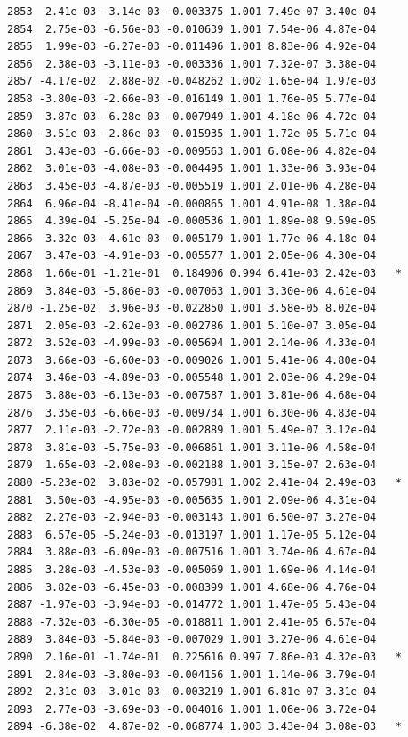 \documentclass[
  letterpaper,
  DIV=11,
  numbers=noendperiod]{scrartcl}
\begin{document}
\begin{verbatim}
2853  2.41e-03 -3.14e-03 -0.003375 1.001 7.49e-07 3.40e-04    
2854  2.75e-03 -6.56e-03 -0.010639 1.001 7.54e-06 4.87e-04    
2855  1.99e-03 -6.27e-03 -0.011496 1.001 8.83e-06 4.92e-04    
2856  2.38e-03 -3.11e-03 -0.003336 1.001 7.32e-07 3.38e-04    
2857 -4.17e-02  2.88e-02 -0.048262 1.002 1.65e-04 1.97e-03    
2858 -3.80e-03 -2.66e-03 -0.016149 1.001 1.76e-05 5.77e-04    
2859  3.87e-03 -6.28e-03 -0.007949 1.001 4.18e-06 4.72e-04    
2860 -3.51e-03 -2.86e-03 -0.015935 1.001 1.72e-05 5.71e-04    
2861  3.43e-03 -6.66e-03 -0.009563 1.001 6.08e-06 4.82e-04    
2862  3.01e-03 -4.08e-03 -0.004495 1.001 1.33e-06 3.93e-04    
2863  3.45e-03 -4.87e-03 -0.005519 1.001 2.01e-06 4.28e-04    
2864  6.96e-04 -8.41e-04 -0.000865 1.001 4.91e-08 1.38e-04    
2865  4.39e-04 -5.25e-04 -0.000536 1.001 1.89e-08 9.59e-05    
2866  3.32e-03 -4.61e-03 -0.005179 1.001 1.77e-06 4.18e-04    
2867  3.47e-03 -4.91e-03 -0.005577 1.001 2.05e-06 4.30e-04    
2868  1.66e-01 -1.21e-01  0.184906 0.994 6.41e-03 2.42e-03   *
2869  3.84e-03 -5.86e-03 -0.007063 1.001 3.30e-06 4.61e-04    
2870 -1.25e-02  3.96e-03 -0.022850 1.001 3.58e-05 8.02e-04    
2871  2.05e-03 -2.62e-03 -0.002786 1.001 5.10e-07 3.05e-04    
2872  3.52e-03 -4.99e-03 -0.005694 1.001 2.14e-06 4.33e-04    
2873  3.66e-03 -6.60e-03 -0.009026 1.001 5.41e-06 4.80e-04    
2874  3.46e-03 -4.89e-03 -0.005548 1.001 2.03e-06 4.29e-04    
2875  3.88e-03 -6.13e-03 -0.007587 1.001 3.81e-06 4.68e-04    
2876  3.35e-03 -6.66e-03 -0.009734 1.001 6.30e-06 4.83e-04    
2877  2.11e-03 -2.72e-03 -0.002889 1.001 5.49e-07 3.12e-04    
2878  3.81e-03 -5.75e-03 -0.006861 1.001 3.11e-06 4.58e-04    
2879  1.65e-03 -2.08e-03 -0.002188 1.001 3.15e-07 2.63e-04    
2880 -5.23e-02  3.83e-02 -0.057981 1.002 2.41e-04 2.49e-03   *
2881  3.50e-03 -4.95e-03 -0.005635 1.001 2.09e-06 4.31e-04    
2882  2.27e-03 -2.94e-03 -0.003143 1.001 6.50e-07 3.27e-04    
2883  6.57e-05 -5.24e-03 -0.013197 1.001 1.17e-05 5.12e-04    
2884  3.88e-03 -6.09e-03 -0.007516 1.001 3.74e-06 4.67e-04    
2885  3.28e-03 -4.53e-03 -0.005069 1.001 1.69e-06 4.14e-04    
2886  3.82e-03 -6.45e-03 -0.008399 1.001 4.68e-06 4.76e-04    
2887 -1.97e-03 -3.94e-03 -0.014772 1.001 1.47e-05 5.43e-04    
2888 -7.32e-03 -6.30e-05 -0.018811 1.001 2.41e-05 6.57e-04    
2889  3.84e-03 -5.84e-03 -0.007029 1.001 3.27e-06 4.61e-04    
2890  2.16e-01 -1.74e-01  0.225616 0.997 7.86e-03 4.32e-03   *
2891  2.84e-03 -3.80e-03 -0.004156 1.001 1.14e-06 3.79e-04    
2892  2.31e-03 -3.01e-03 -0.003219 1.001 6.81e-07 3.31e-04    
2893  2.77e-03 -3.69e-03 -0.004016 1.001 1.06e-06 3.72e-04    
2894 -6.38e-02  4.87e-02 -0.068774 1.003 3.43e-04 3.08e-03   *

\end{verbatim}
\end{document}
